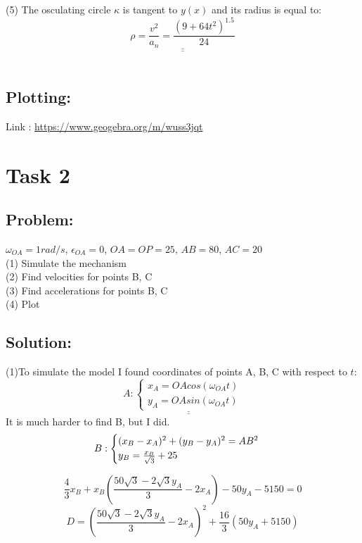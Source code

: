 \documentclass[a4paper,11pt,oneside,article]{memoir}
\def\doubleunderline#1{\underline{\underline{#1}}}
\begin{document}
(5) The osculating circle $\kappa$ is tangent to $y(x)$ and its radius is equal to:
\begin{equation*}
\doubleunderline{
    \rho = \frac{v^2}{a_n} = \frac{(9+64t^2)^{1.5}}{24}
}
\end{equation*}
\\
\subsection{Plotting:}

Link : \url{https://www.geogebra.org/m/wuss3jqt}

\section*{Task 2}

\subsection{Problem:}
$\omega_{OA} = 1 rad/s$, $\epsilon_{OA} = 0$, $OA = OP = 25$, $AB = 80$, $AC = 20$ \\ 
(1) Simulate the mechanism \\
(2) Find velocities for points B, C\\
(3) Find accelerations for points B, C \\
(4) Plot
\subsection{Solution:}
(1)To simulate the model I found coordinates of points A, B, C with respect to $t$:\\
\begin{equation*}
A:
\doubleunderline{
    \begin{cases}
        x_A = OAcos(\omega_{OA}t)
        \\
        y_A = OAsin(\omega_{OA}t)
\end{cases}
}
\end{equation*}
It is much harder to find B, but I did.\\
\begin{equation*}
B:
    \begin{cases}
        (x_B-x_A)^2 + (y_B-y_A)^2 = AB^2
        \\
        y_B = \frac{x_B}{\sqrt{3}} + 25
\end{cases}\\
\end{equation*}

\begin{equation*}
    \frac{4}{3}x_B+x_B(\frac{50\sqrt{3}-2\sqrt{3}y_A}{3} - 2x_A) - 50y_A - 5150 = 0
\end{equation*}
\begin{equation*}
    D = (\frac{50\sqrt{3}-2\sqrt{3}y_A}{3} - 2x_A)^2 + \frac{16}{3}(50y_A + 5150)
\end{equation*}
\end{document}
